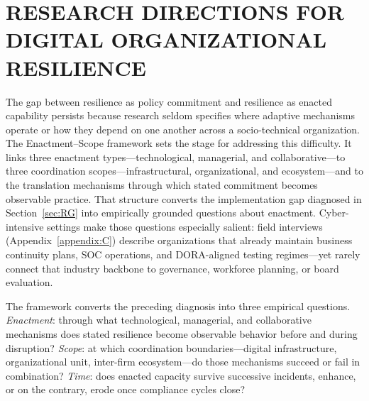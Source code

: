 \section{\MakeUppercase {Research Directions for Digital Organizational Resilience}}
\label{sec:RD}
\renewcommand{\baselinestretch}{2.0}\normalsize


The gap between resilience as policy commitment and resilience as enacted capability persists because research seldom specifies where adaptive mechanisms operate or how they depend on one another across a socio-technical organization. The Enactment--Scope framework sets the stage for addressing this difficulty. It links three enactment types---technological, managerial, and collaborative---to three coordination scopes---infrastructural, organizational, and ecosystem---and to the translation mechanisms through which stated commitment becomes observable practice. That structure converts the implementation gap diagnosed in Section~\ref{sec:RG} into empirically grounded questions about enactment. Cyber-intensive settings make those questions especially salient: field interviews (Appendix~\ref{appendix:C}) describe organizations that already maintain business continuity plans, SOC operations, and DORA-aligned testing regimes---yet rarely connect that industry backbone to governance, workforce planning, or board evaluation.

The framework converts the preceding diagnosis into three empirical questions. \emph{Enactment}: through what technological, managerial, and collaborative mechanisms does stated resilience become observable behavior before and during disruption? \emph{Scope}: at which coordination boundaries---digital infrastructure, organizational unit, inter-firm ecosystem---do those mechanisms succeed or fail in combination? \emph{Time}: does enacted capacity survive successive incidents, enhance, or on the contrary, erode once compliance cycles close?

